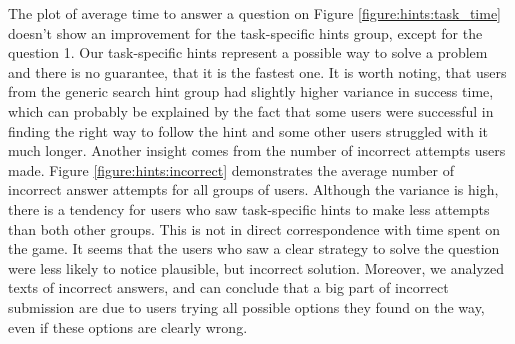 The plot of average time to answer a question on Figure \ref{figure:hints:task_time} doesn't show an improvement for the task-specific hints group, except for the question 1.
Our task-specific hints represent a possible way to solve a problem and there is no guarantee, that it is the fastest one.
It is worth noting, that users from the generic search hint group had slightly higher variance in success time, which can probably be explained by the fact that some users were successful in finding the right way to follow the hint and some other users struggled with it much longer.
Another insight comes from the number of incorrect attempts users made.
Figure \ref{figure:hints:incorrect} demonstrates the average number of incorrect answer attempts for all groups of users.
Although the variance is high, there is a tendency for users who saw task-specific hints to make less attempts than both other groups.
This is not in direct correspondence with time spent on the game.
It seems that the users who saw a clear strategy to solve the question were less likely to notice plausible, but incorrect solution.
Moreover, we analyzed texts of incorrect answers, and can conclude that a big part of incorrect submission are due to users trying all possible options they found on the way, even if these options are clearly wrong.

